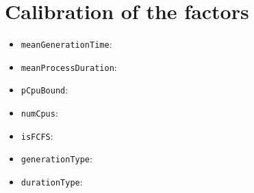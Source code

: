 \section{Calibration of the factors}

\begin{itemize}
    \item \texttt{meanGenerationTime}: 
    \item \texttt{meanProcessDuration}: 
    \item \texttt{pCpuBound}: 
    \item \texttt{numCpus}: 
    \item \texttt{isFCFS}: 
    \item \texttt{generationType}: 
    \item \texttt{durationType}: 
\end{itemize}
